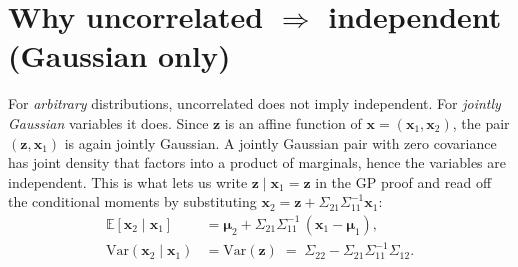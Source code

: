 \documentclass[11pt]{article}
\begin{document}
\section*{Why uncorrelated $\Rightarrow$ independent (Gaussian only)}

For \emph{arbitrary} distributions, uncorrelated does not imply
independent. For \emph{jointly Gaussian} variables it does. Since
$\bm{z}$ is an affine function of $\bm{x} = (\bm{x}_1, \bm{x}_2)$, the
pair $(\bm{z}, \bm{x}_1)$ is again jointly Gaussian. A jointly
Gaussian pair with zero covariance has joint density that factors into
a product of marginals, hence the variables are independent. This is
what lets us write $\bm{z} \mid \bm{x}_1 = \bm{z}$ in the GP proof and
read off the conditional moments by substituting
$\bm{x}_2 = \bm{z} + \Sigma_{21}\Sigma_{11}^{-1}\bm{x}_1$:
\begin{align}
  \mathbb{E}[\bm{x}_2 \mid \bm{x}_1]   &= \bm{\mu}_2 + \Sigma_{21}\Sigma_{11}^{-1}\,(\bm{x}_1 - \bm{\mu}_1), \\
  \mathrm{Var}(\bm{x}_2 \mid \bm{x}_1) &= \mathrm{Var}(\bm{z}) \;=\; \Sigma_{22} - \Sigma_{21}\Sigma_{11}^{-1}\Sigma_{12}.
\end{align}
\end{document}
